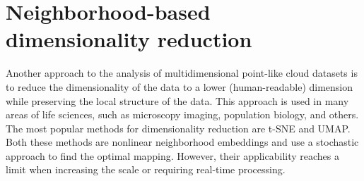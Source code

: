 




\section{Neighborhood-based dimensionality reduction}

Another approach to the analysis of multidimensional point-like cloud datasets is to reduce the dimensionality of the data to a lower (human-readable) dimension while preserving the local structure of the data. This approach is used in many areas of life sciences, such as microscopy imaging, population biology, and others. The most popular methods for dimensionality reduction are t-SNE and UMAP. Both these methods are nonlinear neighborhood embeddings and use a stochastic approach to find the optimal mapping. However, their applicability reaches a limit when increasing the scale or requiring real-time processing.

